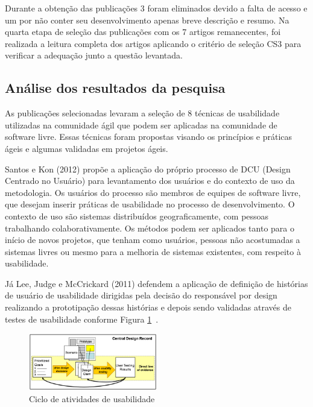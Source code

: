 \documentclass[12pt]{article}
\begin{document}
%
Durante a obtenção das publicações 3 foram eliminados devido a falta de acesso e um por não conter seu desenvolvimento apenas breve descrição e resumo. Na quarta etapa de seleção das publicações com os 7 artigos remanecentes, foi realizada a leitura completa dos artigos aplicando o critério de seleção CS3 para verificar a adequação junto a questão levantada.


\subsection{Análise dos resultados da pesquisa}
As publicações selecionadas levaram a seleção de 8 técnicas de usabilidade utilizadas na comunidade ágil que podem ser aplicadas na comunidade de software livre. Essas técnicas foram propostas visando os princípios e práticas ágeis e algumas validadas em projetos ágeis.

%
Santos e Kon (2012) propõe a aplicação do próprio processo de DCU (Design Centrado no Usuário) para levantamento dos usuários e do contexto de uso da metodologia. Os usuários do processo são membros de equipes de software livre, que desejam inserir práticas de usabilidade no processo de desenvolvimento. O contexto de uso são sistemas distribuídos geograficamente, com pessoas trabalhando colaborativamente. Os métodos podem ser aplicados tanto para o início de novos projetos, que tenham como usuários, pessoas não acostumadas a sistemas livres ou mesmo para a melhoria de sistemas existentes, com respeito à usabilidade.~\cite{}%

%
Já Lee, Judge e McCrickard (2011) defendem a aplicação de definição de histórias de usuário de usabilidade dirigidas pela decisão do responsável por design realizando a prototipação dessas histórias e depois sendo validadas através de testes de usabilidade conforme Figura \ref{fig:figuraCDR}~\cite{}.

\begin{figure}[H]
  \begin{center}
    \includegraphics[width=0.5\textwidth]{figure/figuraCDR.png}
    \caption{Ciclo de atividades de usabilidade}
    \label{fig:figuraCDR}
  \end{center}
\end{figure}
\end{document}
